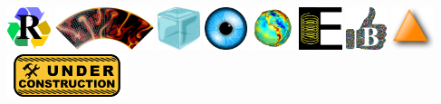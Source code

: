 \noindent
\includegraphics[height=1.25cm]{images/pictograms/replication}
\includegraphics[height=1.25cm]{images/pictograms/aspect_logo}
\includegraphics[height=1.25cm]{images/pictograms/ice}
\includegraphics[height=1.25cm]{images/pictograms/visualisation}
\includegraphics[height=1.25cm]{images/pictograms/gravity}
\includegraphics[height=1.25cm]{images/pictograms/elasticity}
\includegraphics[height=1.25cm]{images/pictograms/benchmark}
\includegraphics[height=1.25cm]{images/pictograms/triangle}
\includegraphics[height=1.25cm]{images/pictograms/under_construction}

